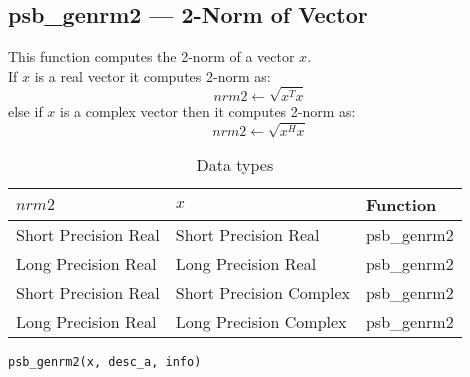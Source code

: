 %
%


\clearpage\subsection*{psb\_genrm2 --- 2-Norm of Vector}

This function computes the 2-norm of a vector $x$.\\
If $x$ is a  real  vector
it computes 2-norm as:
\[ nrm2 \leftarrow \sqrt{x^T x}\]
else if $x$ is a complex vector then it computes 2-norm  as:
\[ nrm2 \leftarrow \sqrt{x^H x}\]

\begin{table}[h]
\begin{center}
\begin{tabular}{lll}
\hline
$nrm2$ & $x$ & {\bf Function}\\
\hline
Short Precision Real&Short Precision Real & psb\_genrm2 \\
Long Precision Real&Long Precision Real & psb\_genrm2 \\
Short Precision Real&Short Precision Complex & psb\_genrm2 \\
Long Precision Real&Long Precision Complex & psb\_genrm2 \\
\hline
\end{tabular}
\end{center}
\caption{Data types\label{tab:f90nrm2}}
\end{table}

\begin{verbatim}
psb_genrm2(x, desc_a, info)
\end{verbatim}

